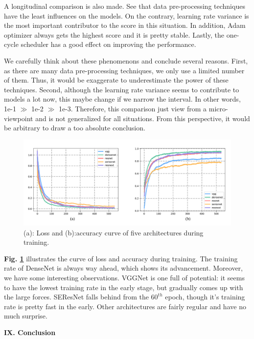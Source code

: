 \documentclass[a4paper]{article}
\begin{document}
{A longitudinal comparison is also made. See that data pre-processing techniques have the least influences on the models. On the contrary, learning rate variance is the most important contributor to the score in this situation. In addition, Adam optimizer always gets the highest score and it is pretty stable. Lastly, the one-cycle scheduler has a good effect on improving the performance.

We carefully think about these phenomenons and conclude several reasons. First, as there are many data pre-processing techniques, we only use a limited number of them. Thus, it would be exaggerate to underestimate the power of these techniques. Second, although the learning rate variance seems to contribute to models a lot now, this maybe change if we narrow the interval. In other words, 1e-1 $\gg$ 1e-2 $\gg$ 1e-3. Therefore, this comparison just view from a micro-viewpoint and is not generalized for all situations. From this perspective, it would be arbitrary to draw a too absolute conclusion.

\begin{figure}[h]
\centering
\includegraphics[width=15cm]{loss_total.pdf}
\caption{ (a): Loss and (b):accuracy curve of five architectures during training.}
\label{lossacctotal}
\end{figure}

\textbf{Fig. \ref{lossacctotal}} illustrates the curve of loss and accuracy during training. The training rate of \textsf{DenseNet} is always way ahead, which shows its advancement. Moreover, we have some interesting observations. \textsf{VGGNet} is one full of potential: it seems to have the lowest training rate in the early stage, but gradually comes up with the large forces. \textsf{SEResNet} falls behind from the $60^{th}$ epoch, though it's training rate is pretty fast in the early. Other architectures are fairly regular and have no much surprise.

}
\clearpage
\vspace{15mm}
\begin{center}
\LARGE\textbf{IX. Conclusion} \\
\end{center}
\vspace{2mm}
\end{document}
